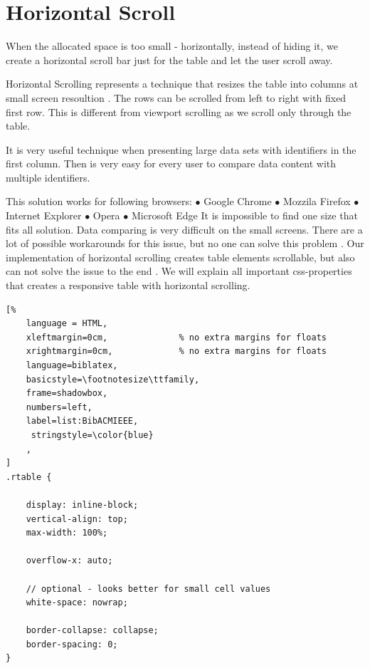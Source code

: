 \newpage
\section{Horizontal Scroll}
When the allocated space is too small - horizontally, instead of hiding it, we create a horizontal scroll bar just for the table and let the user scroll away. 
\newline 

Horizontal Scrolling represents a technique that resizes the table  
into columns at small screen resoultion \parencite{HS_1}. The rows can be scrolled from left to right with fixed first row.
This is different from viewport scrolling as we scroll only through the table.
\newline 

It is very useful technique when presenting large data sets with identifiers in the first column. Then is very easy for every user to compare data content with multiple identifiers\parencite{HS}.


This solution works for following browsers:
\newline $\bullet$ Google Chrome
\newline $\bullet$ Mozzila Firefox
\newline $\bullet$ Internet Explorer
\newline $\bullet$ Opera
\newline $\bullet$ Microsoft Edge
\newline
\newline It is impossible to find one size that fits all solution. Data comparing is very difficult on the small screens.
There are a lot of possible workarounds for this issue, but no one can solve this problem \parencite{HS_1}. 
Our implementation of horizontal scrolling creates table elements scrollable, but also can not solve the issue to the end \parencite{HS_1}.
We will explain all important css-properties that creates a responsive table with horizontal scrolling.

\begin{lstlisting}[%
    language = HTML, 
    xleftmargin=0cm,              % no extra margins for floats
    xrightmargin=0cm,             % no extra margins for floats
    language=biblatex,
    basicstyle=\footnotesize\ttfamily,
    frame=shadowbox,
    numbers=left,
    label=list:BibACMIEEE,
     stringstyle=\color{blue}
    ,
]
.rtable {

    display: inline-block;
    vertical-align: top;
    max-width: 100%;

    overflow-x: auto;

    // optional - looks better for small cell values
    white-space: nowrap;

    border-collapse: collapse;
    border-spacing: 0;
}

\end{lstlisting}

